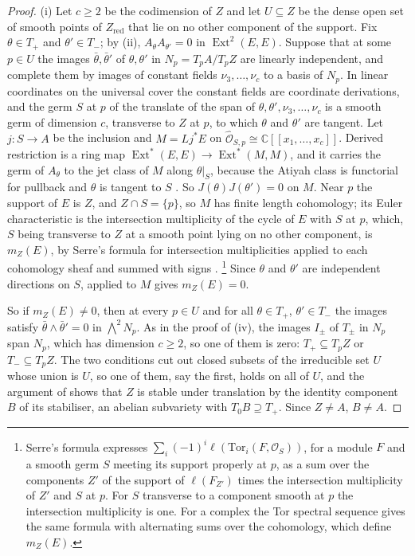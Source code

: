 \documentclass[11pt,reqno]{amsart}
\theoremstyle{plain}
\theoremstyle{definition}
\theoremstyle{remark}
\newcommand{\CC}{\mathbb{C}}
\newcommand{\cO}{\mathcal{O}}
\DeclareMathOperator{\Ext}{Ext}
\begin{document}
\begin{proof}
(i) Let $c\ge2$ be the codimension of $Z$ and let $U\subseteq Z$ be the dense
open set of smooth points of $Z_{\mathrm{red}}$ that lie on no other component
of the support. Fix $\theta\in T_{+}$ and $\theta'\in T_{-}$; by
(ii), $A_{\theta}A_{\theta'}=0$ in $\Ext^{2}(E,E)$.
Suppose that at some $p\in U$ the images $\bar\theta,\bar\theta'$ of
$\theta,\theta'$ in $N_{p}=T_{p}A/T_{p}Z$ are linearly independent, and
complete them by images of constant fields $\nu_{3},\dots,\nu_{c}$ to a basis
of $N_{p}$. In linear coordinates on the universal cover the constant fields
are coordinate derivations, and the germ $S$ at $p$ of the translate of the
span of $\theta,\theta',\nu_{3},\dots,\nu_{c}$ is a smooth germ of dimension
$c$, transverse to $Z$ at $p$, to which $\theta$ and $\theta'$ are tangent.
Let $j\colon S\to A$ be the inclusion and $M=Lj^{*}E$ on
$\widehat{\cO}_{S,p}\cong\CC[[x_{1},\dots,x_{c}]]$. Derived restriction is a
ring map $\Ext^{*}(E,E)\to\Ext^{*}(M,M)$, and it carries the germ of
$A_{\theta}$ to the jet class of $M$ along $\theta|_{S}$, because the Atiyah
class is functorial for pullback and $\theta$ is tangent to $S$
\cite[Section 3]{BF03}. So $J(\theta)J(\theta')=0$ on $M$. Near $p$ the support
of $E$ is $Z$, and $Z\cap S=\{p\}$, so $M$ has finite length cohomology; its
Euler characteristic is the intersection multiplicity of the cycle of $E$
with $S$ at $p$, which, $S$ being transverse to $Z$ at a smooth point lying on
no other component, is $m_{Z}(E)$, by Serre's formula for intersection
multiplicities applied to each cohomology sheaf and summed with signs
\cite[Chapter~V]{Ser00}.%
\footnote{Serre's formula expresses $\sum_{i}(-1)^{i}\ell(\mathrm{Tor}_{i}(F,
\cO_{S}))$, for a module $F$ and a smooth germ $S$ meeting its support
properly at $p$, as a sum over the components $Z'$ of the support of
$\ell(F_{Z'})$ times the intersection multiplicity of $Z'$ and $S$ at $p$. For
$S$ transverse to a component smooth at $p$ the intersection multiplicity is
one. For a complex the Tor spectral sequence gives the same formula with
alternating sums over the cohomology, which define $m_{Z}(E)$.}
Since $\theta$ and $\theta'$ are independent directions on $S$,
 applied to $M$ gives $m_{Z}(E)=0$.

So if $m_{Z}(E)\ne0$, then at every $p\in U$ and for all $\theta\in T_{+}$,
$\theta'\in T_{-}$ the images satisfy $\bar\theta\wedge\bar\theta'=0$ in
$\bigwedge^{2}N_{p}$. As in the proof of (iv), the images
$I_{\pm}$ of $T_{\pm}$ in $N_{p}$ span $N_{p}$, which has dimension $c\ge2$,
so one of them is zero: $T_{+}\subseteq T_{p}Z$ or $T_{-}\subseteq T_{p}Z$.
The two conditions cut out closed subsets of the irreducible set $U$ whose
union is $U$, so one of them, say the first, holds on all of $U$, and the
argument of  shows that $Z$ is stable under translation by
the identity component $B$ of its stabiliser, an abelian subvariety with
$T_{0}B\supseteq T_{+}$. Since $Z\ne A$, $B\ne A$.


\end{proof}
\end{document}
